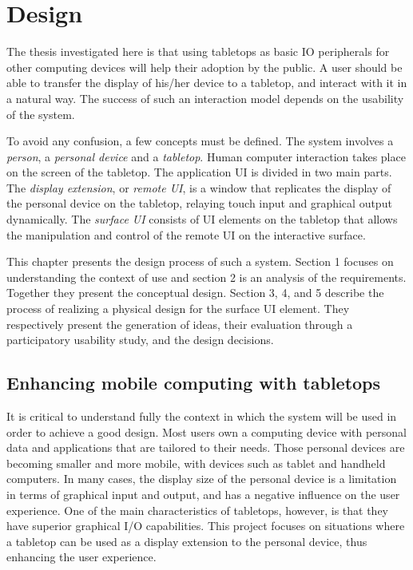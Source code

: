 

\chapter{Design}
\label{design}

The thesis investigated here is that using tabletops as basic IO peripherals for other computing devices will help their adoption by the public.
A user should be able to transfer the display of his/her device to a tabletop, and interact with it in a natural way.
The success of such an interaction model depends on the usability of the system. 

To avoid any confusion, a few concepts must be defined.
The system involves a \emph{person}, a \emph{personal device} and a \emph{tabletop}.
Human computer interaction takes place on the screen of the tabletop.
The application UI is divided in two main parts.
The \emph{display extension}, or \emph{remote UI}, is a window that replicates the display of the personal device on the tabletop, relaying touch input and graphical output dynamically.
The \emph{surface UI} consists of UI elements on the tabletop that allows the manipulation and control of the remote UI on the interactive surface.

This chapter presents the design process of such a system.
Section 1 focuses on understanding the context of use and section 2 is an analysis of the requirements. Together they present the conceptual design.
Section 3, 4, and 5 describe the process of realizing a physical design for the surface UI element. They respectively present the generation of ideas, their evaluation through a participatory usability study, and the design decisions.

\section{Enhancing mobile computing with tabletops}

It is critical to understand fully the context in which the system will be used in order to achieve a good design.
Most users own a computing device with personal data and applications that are tailored to their needs.
Those personal devices are becoming smaller and more mobile, with devices such as tablet and handheld computers.
In many cases, the display size of the personal device is a limitation in terms of graphical input and output, and has a negative influence on the user experience.
One of the main characteristics of tabletops, however, is that they have superior graphical I/O capabilities.
This project focuses on situations where a tabletop can be used as a display extension to the personal device, thus enhancing the user experience.

